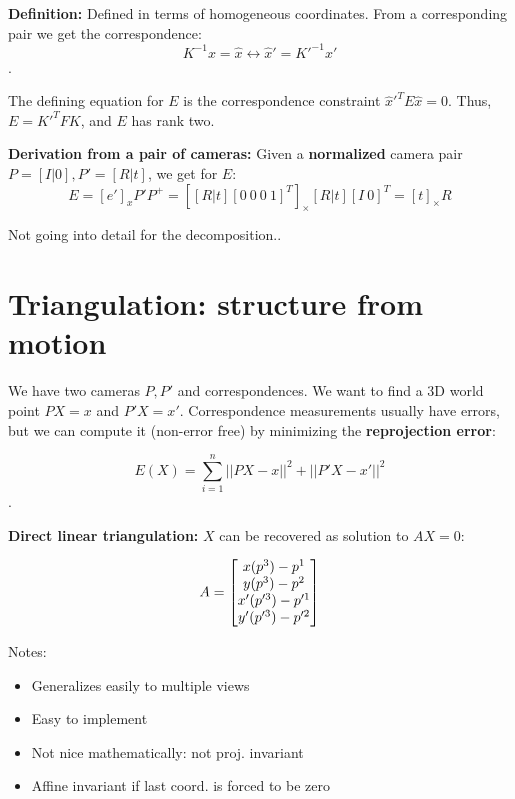\textbf{Definition:} Defined in terms of homogeneous coordinates. From a corresponding pair we get the correspondence: $$K^{-1} x = \hat{x} \leftrightarrow \hat{x}' = K'^{-1} x'$$.

The defining equation for $E$ is the correspondence constraint $\hat{x}'^T E \hat{x} = 0$. Thus, $E = K'^T F K$, and $E$ has rank two.

\textbf{Derivation from a pair of cameras:} Given a \textbf{normalized} camera pair $P = [I|0], P' = [R|t]$, we get for $E$: $$E = [e']_x P'P^+ = [[R|t][0 \ 0 \ 0 \ 1]^T]_\times [R|t][I \ 0]^T = [t]_\times R$$

Not going into detail for the decomposition..

\section{Triangulation: structure from motion}

We have two cameras $P,P'$ and correspondences. We want to find a 3D world point $PX = x$ and $P'X = x'$. Correspondence measurements usually have errors, but we can compute it (non-error free) by minimizing the \textbf{reprojection error}:

$$E(X) = \sum\limits_{i=1}^n ||PX - x||^2 + ||P'X - x'||^2$$.

\textbf{Direct linear triangulation:} $X$ can be recovered as solution to $AX = 0$:

$$A = \left[\begin{matrix}x(p^3) - p^1 \\ y(p^3) - p^2 \\ x'(p'^3) - p'^1 \\ y'(p'^3) - p'^2\end{matrix}\right]$$

Notes: \begin{itemize}
    \item Generalizes easily to multiple views
    \item Easy to implement
    \item Not nice mathematically: not proj. invariant
    \item Affine invariant if last coord. is forced to be zero
\end{itemize}



